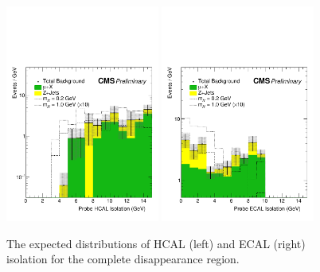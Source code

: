 \begin{figure}[htbp]
	\centering
	\includegraphics[width=0.45\textwidth]{figures/totDisappHcalIso.pdf}
	\hspace{0.01\textwidth}
	\includegraphics[width=0.45\textwidth]{figures/totDisappEcalIso.pdf}
	\caption[Expected Complete Disappearance Isolation]{The expected distributions of HCAL (left) and ECAL (right) isolation for the complete disappearance region.}
	\label{fig:totHcalIso}
\end{figure}


